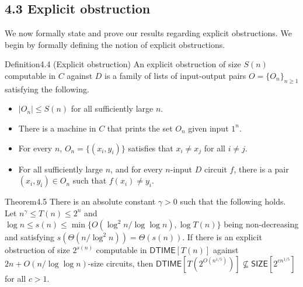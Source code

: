 \subsection*{4.3 Explicit obstruction}
We now formally state and prove our results regarding explicit obstructions. We begin by formally defining the notion of explicit obstructions.
\begin{authorclaim}{Definition4.4 (Explicit obstruction)}
An explicit obstruction of size $S(n)$ computable in $C$ against $D$ is a family of lists of input-output pairs $O=\{O_n\}_{n\ge1}$ satisfying the following.
\begin{itemize}
\item $|O_n|\le S(n)$ for all sufficiently large $n$.
\item There is a machine in $C$ that prints the set $O_n$ given input $1^n$.
\item For every $n$, $O_n=\{(x_i,y_i)\}$ satisfies that $x_i\ne x_j$ for all $i\ne j$.
\item For all sufficiently large $n$, and for every $n$-input $D$ circuit $f$, there is a pair $(x_i,y_i)\in O_n$ such that $f(x_i)\ne y_i$.
\end{itemize}
\end{authorclaim}
\begin{authorclaim}{Theorem4.5}
There is an absolute constant $\gamma>0$ such that the following holds. Let $n^\gamma\le T(n)\le2^n$ and $\log n\le s(n)\le\min\{O(\log^2n/\log\log n),\log T(n)\}$ being non-decreasing and satisfying $s(\Theta(n/\log^2n))=\Theta(s(n))$. If there is an explicit obstruction of size $2^{s(n)}$ computable in $\mathsf{DTIME}[T(n)]$ against $2n+O(n/\log\log n)$-size circuits, then $\mathsf{DTIME}[T(2^{O(n^{1/5})})]\not\subseteq\mathsf{SIZE}[2^{cn^{1/5}}]$ for all $c>1$.
\end{authorclaim}
